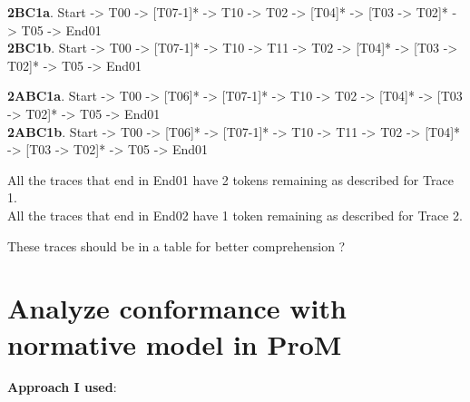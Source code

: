 \documentclass[]{article}
\begin{document}
\textbf{2BC1a}. Start -\textgreater{} T00 -\textgreater{} {[}T07-1{]}*
-\textgreater{} T10 -\textgreater{} T02 -\textgreater{} {[}T04{]}*
-\textgreater{} {[}T03 -\textgreater{} T02{]}* -\textgreater{} T05
-\textgreater{} End01\\\textbf{2BC1b}. Start -\textgreater{} T00
-\textgreater{} {[}T07-1{]}* -\textgreater{} T10 -\textgreater{} T11
-\textgreater{} T02 -\textgreater{} {[}T04{]}* -\textgreater{} {[}T03
-\textgreater{} T02{]}* -\textgreater{} T05 -\textgreater{} End01

\textbf{2ABC1a}. Start -\textgreater{} T00 -\textgreater{} {[}T06{]}*
-\textgreater{} {[}T07-1{]}* -\textgreater{} T10 -\textgreater{} T02
-\textgreater{} {[}T04{]}* -\textgreater{} {[}T03 -\textgreater{}
T02{]}* -\textgreater{} T05 -\textgreater{} End01\\\textbf{2ABC1b}.
Start -\textgreater{} T00 -\textgreater{} {[}T06{]}* -\textgreater{}
{[}T07-1{]}* -\textgreater{} T10 -\textgreater{} T11 -\textgreater{} T02
-\textgreater{} {[}T04{]}* -\textgreater{} {[}T03 -\textgreater{}
T02{]}* -\textgreater{} T05 -\textgreater{} End01

All the traces that end in End01 have 2 tokens remaining as described
for Trace 1.\\All the traces that end in End02 have 1 token remaining as
described for Trace 2.

These traces should be in a table for better comprehension ?

\section{Analyze conformance with normative model in
ProM}\label{analyze-conformance-with-normative-model-in-prom}

\textbf{Approach I used}:
\end{document}
